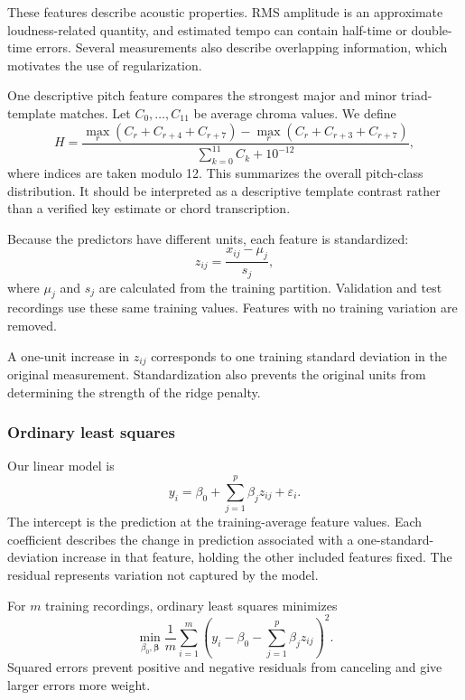 These features describe acoustic properties. RMS amplitude is an approximate loudness-related quantity, and estimated tempo can contain half-time or double-time errors. Several measurements also describe overlapping information, which motivates the use of regularization.

One descriptive pitch feature compares the strongest major and minor triad-template matches. Let $C_0,\ldots,C_{11}$ be average chroma values. We define
\begin{equation}
H=
\frac{
\max_r(C_r+C_{r+4}+C_{r+7})
-
\max_r(C_r+C_{r+3}+C_{r+7})
}{
\sum_{k=0}^{11}C_k+10^{-12}
},
\label{eq:triad}
\end{equation}
where indices are taken modulo 12. This summarizes the overall pitch-class distribution. It should be interpreted as a descriptive template contrast rather than a verified key estimate or chord transcription.

Because the predictors have different units, each feature is standardized:
\begin{equation}
z_{ij}=\frac{x_{ij}-\mu_j}{s_j},
\label{eq:standardization}
\end{equation}
where $\mu_j$ and $s_j$ are calculated from the training partition. Validation and test recordings use these same training values. Features with no training variation are removed.

A one-unit increase in $z_{ij}$ corresponds to one training standard deviation in the original measurement. Standardization also prevents the original units from determining the strength of the ridge penalty.

\subsubsection{Ordinary least squares}

Our linear model is
\begin{equation}
y_i=\beta_0+\sum_{j=1}^{p}\beta_jz_{ij}+\varepsilon_i.
\label{eq:linear}
\end{equation}
The intercept is the prediction at the training-average feature values. Each coefficient describes the change in prediction associated with a one-standard-deviation increase in that feature, holding the other included features fixed. The residual represents variation not captured by the model.

For $m$ training recordings, ordinary least squares minimizes
\begin{equation}
\min_{\beta_0,\boldsymbol\beta}
\frac{1}{m}\sum_{i=1}^{m}
\left(y_i-\beta_0-\sum_{j=1}^{p}\beta_jz_{ij}\right)^2.
\label{eq:ols}
\end{equation}
Squared errors prevent positive and negative residuals from canceling and give larger errors more weight.


